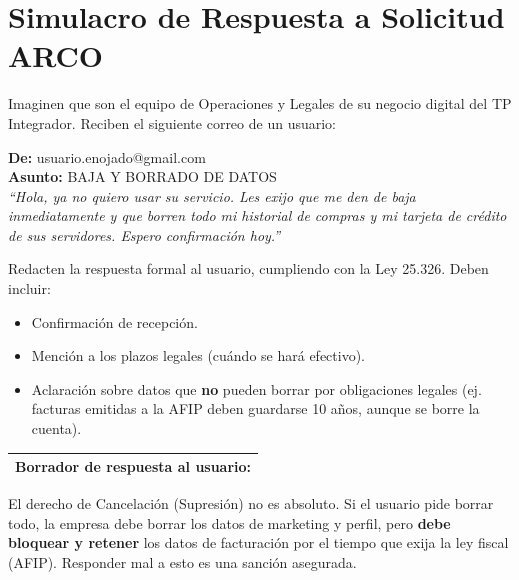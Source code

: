 \documentclass[12pt,a4paper]{article}
\renewcommand{\arraystretch}{1.25}
\begin{document}
\newpage
\section{Simulacro de Respuesta a Solicitud ARCO}

Imaginen que son el equipo de Operaciones y Legales de su negocio digital del TP Integrador. Reciben el siguiente correo de un usuario:

\begin{tcolorbox}[colback=grisClaro, colframe=gray, arc=2mm]
\textbf{De:} usuario.enojado@gmail.com\\
\textbf{Asunto:} BAJA Y BORRADO DE DATOS\\
\textit{``Hola, ya no quiero usar su servicio. Les exijo que me den de baja inmediatamente y que borren todo mi historial de compras y mi tarjeta de cr\'edito de sus servidores. Espero confirmaci\'on hoy.''}
\end{tcolorbox}

\begin{cajaActividad}[title={Redacci\'on de la respuesta}]
Redacten la respuesta formal al usuario, cumpliendo con la Ley 25.326. Deben incluir:
\begin{itemize}[leftmargin=1.5em]
    \item Confirmaci\'on de recepci\'on.
    \item Menci\'on a los plazos legales (cu\'ando se har\'a efectivo).
    \item Aclaraci\'on sobre datos que \textbf{no} pueden borrar por obligaciones legales (ej. facturas emitidas a la AFIP deben guardarse 10 a\~nos, aunque se borre la cuenta).
\end{itemize}
\end{cajaActividad}

\vspace{6pt}
\renewcommand{\arraystretch}{1.5}
\begin{tabularx}{\textwidth}{|X|}
\hline
\textbf{Borrador de respuesta al usuario:} \\[8cm]
\hline
\end{tabularx}

\begin{cajaConcepto}[title={El dilema de la Cancelaci\'on vs Retenci\'on Legal}]
El derecho de Cancelaci\'on (Supresi\'on) no es absoluto. Si el usuario pide borrar todo, la empresa debe borrar los datos de marketing y perfil, pero \textbf{debe bloquear y retener} los datos de facturaci\'on por el tiempo que exija la ley fiscal (AFIP). Responder mal a esto es una sanci\'on asegurada.
\end{cajaConcepto}
\end{document}
